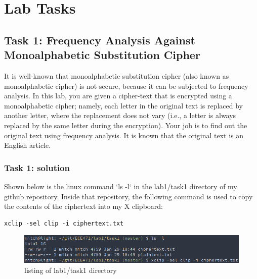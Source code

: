 \documentclass[12pt]{article}
\begin{document}
\clearpage

\section{Lab Tasks}
\subsection{Task 1: Frequency Analysis Against Monoalphabetic Substitution Cipher}
    
It is well-known that monoalphabetic substitution cipher (also known as monoalphabetic cipher) is not secure, because it can be subjected to frequency analysis. In this lab, you are given a cipher-text that is encrypted using a monoalphabetic cipher; namely, each letter in the original text is replaced by another letter, where the replacement does not vary (i.e., a letter is always replaced by the same letter during the encryption). Your job is to find out the original text using frequency analysis. It is known that the original text is an English article.

\subsubsection{Task 1: solution}

Shown below is the linux command `ls -l` in the lab1/task1 directory of my github repository. Inside that repository, the following command is used to copy the contents of the ciphertext into my X clipboard:
\begin{verbatim}
xclip -sel clip -i ciphertext.txt
\end{verbatim}

\begin{figure}[!ht]
\includegraphics[scale=0.65]{c0.png}
\caption{listing of lab1/task1 directory}
\label{fig:c0}
\end{figure}
\end{document}
